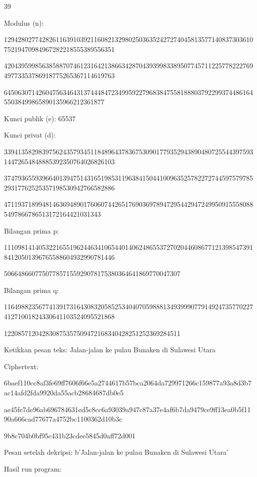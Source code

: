 \documentclass{article}
\begin{document}

39

Modulus (n): 

12942802774282611639103921160821329802503635242727404581357714083730361075219470984967282218555389556351

42043959985638588707461231642138663428704393998338950774571122577822276949773353786918775265367114619763

64506307142604756346431374448472349959227968384755818880379229937448616455038499865890135966212361877

Kunci publik (e): 65537

Kunci privat (d): 

33941358298397562435793451184896437836753090177935294389048072554439759314472654848885392350764026826103

37479365593966401394751431651985311963841504410096352578227274459757978529317762525357198530942766582886

4711937189948146369489017606074426517690369789472954429472499509155580885497866786513172164421031343

Bilangan prima p: 

11109814140532216551962446341065440140624865537270204460867712139854739184120501396765588604932990781446

506648660775077857155929078175380364641869770047307

Bilangan prima q: 

11649882356774139173164308320585253404070598881349399907791492473577022741271001824330641103524095521868

122085712042830875357509472168340428251252369284511

Ketikkan pesan teks:  Jalan-jalan ke pulau Bunaken di Sulawesi Utara

Ciphertext: 

6baef110cc8af3fe69ff7606f66e5a2744617b57bca2064da729971266c159877a93a8d3b7ac14afd2fda9920da55acb28684687db0e5

ae45fe7de96ab696784631ed5c8cc6a93039a947c87a37e4af6b7da9479ce9ff13ea0b5f1190a666cad77677a4752bc1100362d10b3c

9b8c704b0bf95c431b23cdee5845d0aff72d001

Pesan setelah dekripsi: b'Jalan-jalan ke pulau Bunaken di Sulawesi Utara'

Hasil run program:
\end{document}
